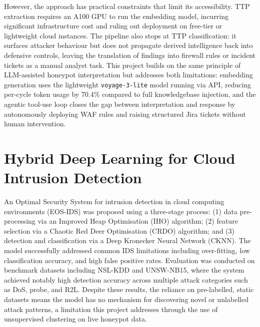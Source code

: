 \documentclass[12pt, a4paper]{report}   %
\begin{document}
However, the approach has practical constraints that limit its 
accessibility. TTP extraction requires an A100 GPU to run the embedding 
model, incurring significant infrastructure cost and ruling out 
deployment on free-tier or lightweight cloud instances. The pipeline 
also stops at TTP classification: it surfaces attacker behaviour but 
does not propagate derived intelligence back into defensive controls, 
leaving the translation of findings into firewall rules or incident 
tickets as a manual analyst task. This project builds on the same 
principle of LLM-assisted honeypot interpretation but addresses both 
limitations: embedding generation uses the lightweight 
\texttt{voyage-3-lite} model running via API, reducing per-cycle token 
usage by 70.4\% compared to full knowledgebase injection, and the 
agentic tool-use loop closes the gap between interpretation and 
response by autonomously deploying WAF rules and raising structured 
Jira tickets without human intervention.


\section{Hybrid Deep Learning for Cloud Intrusion Detection~\cite{eos-ids}}
An Optimal Security System for intrusion detection in cloud computing environments
(EOS-IDS) was proposed using a three-stage process: (1) data pre-processing via an
Improved Heap Optimisation (IHO) algorithm; (2) feature selection via a Chaotic Red
Deer Optimisation (CRDO) algorithm; and (3) detection and classification via a Deep
Kronecker Neural Network (CKNN). The model successfully addressed common IDS
limitations including over-fitting, low classification accuracy, and high false
positive rates. Evaluation was conducted on benchmark datasets including NSL-KDD and
UNSW-NB15, where the system achieved notably high detection accuracy across multiple
attack categories such as DoS, probe, and R2L. Despite these results, the reliance
on pre-labelled, static datasets means the model has no mechanism for discovering
novel or unlabelled attack patterns, a limitation this project addresses through
the use of unsupervised clustering on live honeypot data.
\end{document}
